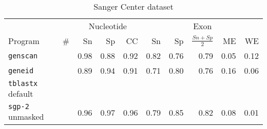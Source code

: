 \begin{table}[!ht]
\caption{Sanger Center dataset}
\label{tbl:acc1}
\begin{center}
\begin{tabular}{|l|r|rrr|rrr|rr|}
\hline
& & \multicolumn{3}{c|}{Nucleotide} & \multicolumn{5}{c|}{Exon} \\
Program & \# & Sn & Sp & CC & Sn & Sp & $\frac{Sn+Sp}{2}$ & ME & WE \\
\hline
{\tt genscan} &  & 0.98 & 0.88 & 0.92 & 0.82 & 0.76 & 0.79 & 0.05 & 0.12 \\
{\tt geneid} &  & 0.89 & 0.94 & 0.91 & 0.71 & 0.80 & 0.76 & 0.16 & 0.06 \\
\hline
{\tt tblastx} default   &  &  &  &  &  & &  &  &  \\
\hline
{\tt sgp-2} unmasked
&  & 0.96 & 0.97 & 0.96 & 0.79 & 0.85 & 0.82 & 0.08 & 0.01 \\
\hline
\end{tabular}
\end{center}
\end{table}

